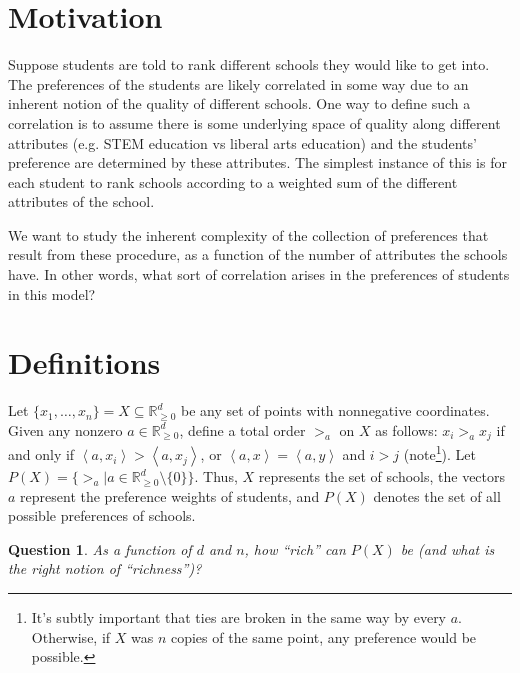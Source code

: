 \documentclass[12pt]{article}
\newtheorem*{question}{Question}
\newcommand{\Rgz}{\mathbb{R}_{\ge 0}}
\newcommand{\ip}[2]{\left\langle{#1},{#2}\right\rangle}
\newcommand{\1}[1]{\mathds{1}[{#1}]}
\begin{document}
\section{Motivation}
  Suppose students are told to rank different schools they would like to
  get into. The preferences of the students are likely correlated in some
  way due to an inherent notion of the quality of different schools.
  One way to define such a correlation is to assume there is some underlying
  space of quality along different attributes (e.g. STEM education vs
  liberal arts education) and the students' preference
  are determined by these attributes.
  The simplest instance of this is for each student to rank schools
  according to a weighted sum of the different attributes of the school.

  We want to study the inherent complexity of the collection of preferences
  that result from these procedure, as a function of the number of attributes
  the schools have. In other words, what sort of correlation arises in the
  preferences of students in this model?


\section{Definitions}

  Let $\{x_1,\ldots,x_n\} = X\subseteq \Rgz^d$ be any set of points
  with nonnegative coordinates.
  Given any nonzero $a\in \Rgz^d$, define a total order $>_a$ on $X$ as follows:
  $x_i >_a x_j$ if and only if $\ip{a}{x_i} > \ip{a}{x_j}$, or
  $\ip{a}{x} = \ip{a}{y}$ and $i > j$ (note\footnote{
    It's subtly important that ties are broken in the same way by every $a$.
    Otherwise, if $X$ was $n$ copies of the same point, any preference
    would be possible.
  }).
  Let $P(X) = \{ >_a | a\in\Rgz^d \setminus \{0\} \}$.
  Thus, $X$ represents the set of schools,
  the vectors $a$ represent the preference weights of students,
  and $P(X)$ denotes the set of all possible preferences of schools.

  \begin{question}
    As a function of $d$ and $n$, how ``rich'' can $P(X)$ be
    (and what is the right notion of ``richness'')?
  \end{question}
\end{document}
